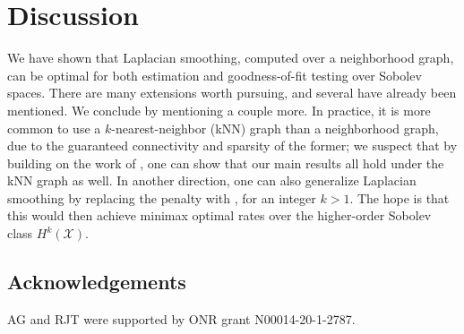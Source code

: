 \documentclass[twoside]{article}
\newcommand{\1}{\mathbf{1}}
\newcommand{\Lap}{L}
\newcommand{\Xset}{\mathcal{X}}
\theoremstyle{definition}
\theoremstyle{remark}
\begin{document}
\section{Discussion}
\label{sec:discussion}

We have shown that Laplacian smoothing, computed over a neighborhood graph, can be optimal for both estimation and goodness-of-fit testing over Sobolev spaces. There are many extensions worth pursuing, and several have already been mentioned. We conclude by mentioning a couple more. In practice, it is more common to use a $k$-nearest-neighbor (kNN) graph than a neighborhood graph, due to the guaranteed connectivity and sparsity of the former; we suspect that by building on the work of \citet{calder2019}, one can show that our main results all hold under the kNN graph as well. In another direction, one can also generalize Laplacian smoothing by replacing the penalty \smash{$f^\top \Lap_{n,r} f$} with \smash{$f^\top \Lap_{n,r}^k f$}, for an integer $k > 1$. The hope is that this would then achieve minimax optimal rates over the higher-order Sobolev class $H^k(\Xset)$. %

\subsection*{Acknowledgements}

AG and RJT were supported by ONR grant N00014-20-1-2787. 


 

\appendix


\end{document}
